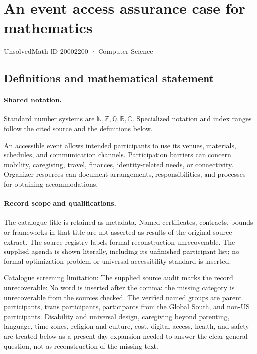 \documentclass[11pt]{article}
\begin{document}
\setcounter{section}{20002199}
\section{An event access assurance case for mathematics}\label{20002200}
{\small\sffamily UnsolvedMath ID 20002200 · Computer Science}
\subsection{Definitions and mathematical statement}

\paragraph{Shared notation.}Standard number systems are $\mathbb N,\mathbb Z,\mathbb Q,\mathbb R,\mathbb C$. Specialized notation and index ranges follow the cited source and the definitions below.


An accessible event allows intended participants to use its venues, materials, schedules, and communication channels. Participation barriers can concern mobility, caregiving, travel, finances, identity-related needs, or connectivity. Organizer resources can document arrangements, responsibilities, and processes for obtaining accommodations.
\paragraph{Record scope and qualifications.}
The catalogue title is retained as metadata. Named certificates, contracts, bounds or frameworks in that title are not asserted as results of the original source extract.
The source registry labels formal reconstruction unrecoverable. The supplied agenda is shown literally, including its unfinished participant list; no formal optimization problem or universal accessibility standard is inserted.

Catalogue screening limitation: The supplied source audit marks the record unrecoverable: No word is inserted after the comma: the missing category is unrecoverable from the sources checked. The verified named groups are parent participants, trans participants, participants from the Global South, and non-US participants. Disability and universal design, caregiving beyond parenting, language, time zones, religion and culture, cost, digital access, health, and safety are treated below as a present-day expansion needed to answer the clear general question, not as reconstruction of the missing text.
\end{document}
